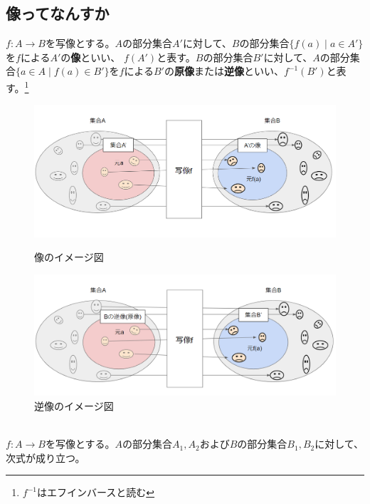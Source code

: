 \documentclass[a4j,dvipdfmx]{jsarticle}
\begin{document}
\subsection{像ってなんすか}
$f:A\to B$を写像とする。$A$の部分集合$A'$に対して、$B$の部分集合$\{f(a)\mid a\in A'\}$を$f$による$A'$の\textbf{像}といい、
$f(A')$と表す。$B$の部分集合$B'$に対して、$A$の部分集合$\{a\in A \mid f(a)\in B'\}$を$f$による$B'$の\textbf{原像}または\textbf{逆像}といい、$f^{-1}(B')$と表す。\footnote{$f^{-1}$はエフインバースと読む}

\begin{figure}[h]
    \begin{minipage}{0.5\linewidth}
        \centering
        \includegraphics[keepaspectratio,scale=0.35]{img/写像_像.png}
        \caption{像のイメージ図}
      \end{minipage}
      \begin{minipage}{0.6\linewidth}
        \centering
        \includegraphics[keepaspectratio, scale=0.35]{img/写像_逆増.png}
        \caption{逆像のイメージ図}
      \end{minipage}
\end{figure}
\hrulefill\\
$f:A\to B$を写像とする。$A$の部分集合$A_1,A_2$および$B$の部分集合$B_1,B_2$に対して、次式が成り立つ。
\end{document}
